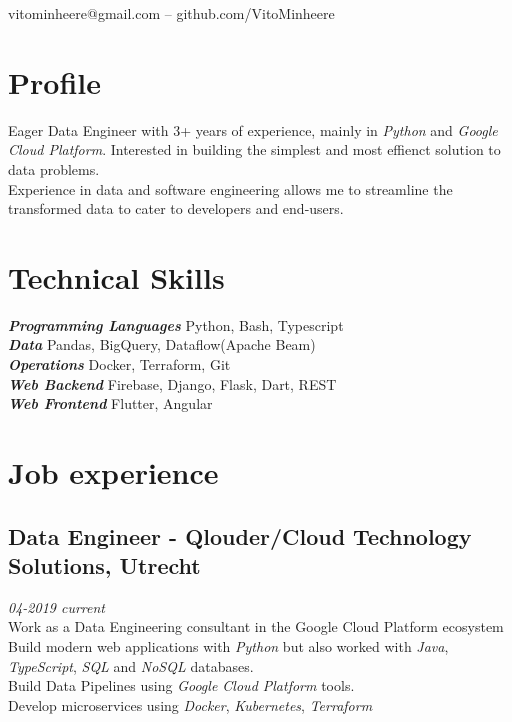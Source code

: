 \documentclass{article}
\makeatletter
\renewcommand{\maketitle}{
\begin{center}
	{\huge\bfseries
	\theauthor}

\vspace*{1cm}
vitominheere@gmail.com -- github.com/VitoMinheere

\end{center}
}
\makeatother
\begin{document}
\author{Vito Minheere}


\maketitle

\section{\sc Profile}
Eager Data Engineer with 3+ years of experience, mainly in \emph{Python} and \emph{Google Cloud Platform}. Interested in building the simplest and most effienct solution to data problems. \\
Experience in data and software engineering allows me to streamline the transformed data to cater to developers and end-users.

\section{\sc Technical Skills}
{\sl \textbf{Programming Languages}} Python, Bash, Typescript \\
{\sl \textbf{Data }} Pandas, BigQuery, Dataflow(Apache Beam) \\
{\sl \textbf{Operations }} Docker, Terraform, Git \\
{\sl \textbf{Web Backend }} Firebase, Django, Flask, Dart, REST \\
{\sl \textbf{Web Frontend }} Flutter, Angular \\

\section{\sc Job experience}
\subsection{Data Engineer - Qlouder/Cloud Technology Solutions, Utrecht} \hfill {\em 04-2019 current} \\
Work as a Data Engineering consultant in the Google Cloud Platform ecosystem \\
Build modern web applications with \emph{Python} but also worked with \emph{Java}, \emph{TypeScript}, \emph{SQL} and \emph{NoSQL} databases. \\ 
Build Data Pipelines using \emph{Google Cloud Platform} tools. \\
Develop microservices using \emph{Docker}, \emph{Kubernetes}, \emph{Terraform} \\
\end{document}
